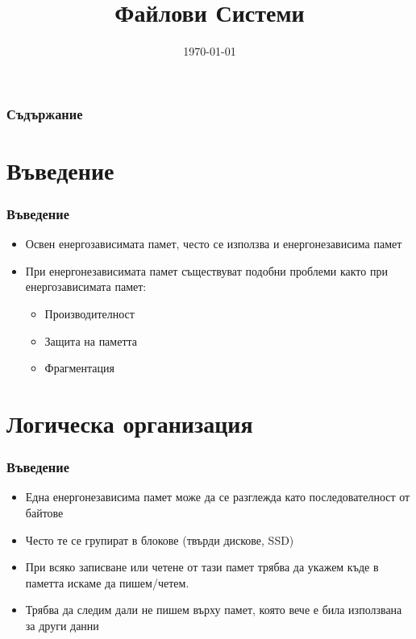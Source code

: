 \documentclass[ignorenonframetext, hyperref=unicode]{beamer}
\title[Файлови Системи]{Файлови Системи}
\date{\today}
\begin{document}
\frame{\maketitle}

\begin{frame}
\frametitle{Съдържание}
\tableofcontents %
\end{frame}

\section{Въведение}

\begin{frame}
\frametitle{Въведение}
\begin{itemize}
  \item Освен енергозависимата памет, често се използва и енергонезависима памет
  \item При енергонезависимата памет съществуват подобни проблеми както при енергозависимата памет:
  \begin{itemize}
    \item Производителност
    \item Защита на паметта
    \item Фрагментация
  \end{itemize}
\end{itemize}
\end{frame}

\section{Логическа организация}

\begin{frame}
\frametitle{Въведение}
\begin{itemize}
  \item Една енергонезависима памет може да се разглежда като последователност от байтове
  \item Често те се групират в блокове (твърди дискове, SSD)
  \item При всяко записване или четене от тази памет трябва да укажем къде в паметта искаме да пишем/четем.
  \item Трябва да следим дали не пишем върху памет, която вече е била използвана за други данни
\end{itemize}
\end{frame}
\end{document}
